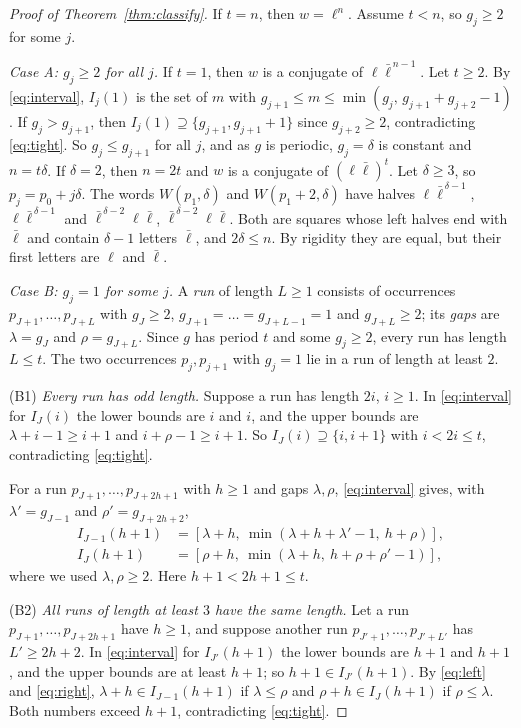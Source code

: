 \documentclass[11pt,reqno]{amsart}
\theoremstyle{definition}
\newcommand{\lb}{\bar\ell}
\begin{document}
\begin{proof}[Proof of Theorem~\ref{thm:classify}]
If $t=n$, then $w=\ell^n$. Assume $t<n$, so $g_j\ge 2$ for some $j$.

\emph{Case A: $g_j\ge 2$ for all $j$.} If $t=1$, then $w$ is a conjugate of $\ell\lb^{\,n-1}$. Let $t\ge 2$. By \eqref{eq:interval}, $I_j(1)$ is the set of $m$ with $g_{j+1}\le m\le\min(g_j,\,g_{j+1}+g_{j+2}-1)$. If $g_j>g_{j+1}$, then $I_j(1)\supseteq\{g_{j+1},g_{j+1}+1\}$ since $g_{j+2}\ge 2$, contradicting \eqref{eq:tight}. So $g_j\le g_{j+1}$ for all $j$, and as $g$ is periodic, $g_j=\delta$ is constant and $n=t\delta$. If $\delta=2$, then $n=2t$ and $w$ is a conjugate of $(\ell\lb)^t$. Let $\delta\ge 3$, so $p_{j}=p_0+j\delta$. The words $W(p_1,\delta)$ and $W(p_1+2,\delta)$ have halves $\ell\lb^{\,\delta-1}$, $\ell\lb^{\,\delta-1}$ and $\lb^{\,\delta-2}\ell\lb$, $\lb^{\,\delta-2}\ell\lb$. Both are squares whose left halves end with $\lb$ and contain $\delta-1$ letters $\lb$, and $2\delta\le n$. By rigidity they are equal, but their first letters are $\ell$ and $\lb$.

\emph{Case B: $g_j=1$ for some $j$.} A \emph{run} of length $L\ge 1$ consists of occurrences $p_{J+1},\dots,p_{J+L}$ with $g_J\ge 2$, $g_{J+1}=\dots=g_{J+L-1}=1$ and $g_{J+L}\ge 2$; its \emph{gaps} are $\lambda=g_J$ and $\rho=g_{J+L}$. Since $g$ has period $t$ and some $g_j\ge 2$, every run has length $L\le t$. The two occurrences $p_j,p_{j+1}$ with $g_j=1$ lie in a run of length at least $2$.

(B1) \emph{Every run has odd length.} Suppose a run has length $2i$, $i\ge 1$. In \eqref{eq:interval} for $I_J(i)$ the lower bounds are $i$ and $i$, and the upper bounds are $\lambda+i-1\ge i+1$ and $i+\rho-1\ge i+1$. So $I_J(i)\supseteq\{i,i+1\}$ with $i<2i\le t$, contradicting \eqref{eq:tight}.

For a run $p_{J+1},\dots,p_{J+2h+1}$ with $h\ge 1$ and gaps $\lambda,\rho$, \eqref{eq:interval} gives, with $\lambda'=g_{J-1}$ and $\rho'=g_{J+2h+2}$,
\begin{align}
I_{J-1}(h+1)&=[\lambda+h,\ \min(\lambda+h+\lambda'-1,\ h+\rho)],\label{eq:left}\\
I_J(h+1)&=[\rho+h,\ \min(\lambda+h,\ h+\rho+\rho'-1)],\label{eq:right}
\end{align}
where we used $\lambda,\rho\ge 2$. Here $h+1<2h+1\le t$.

(B2) \emph{All runs of length at least $3$ have the same length.} Let a run $p_{J+1},\dots,p_{J+2h+1}$ have $h\ge 1$, and suppose another run $p_{J'+1},\dots,p_{J'+L'}$ has $L'\ge 2h+2$. In \eqref{eq:interval} for $I_{J'}(h+1)$ the lower bounds are $h+1$ and $h+1$, and the upper bounds are at least $h+1$; so $h+1\in I_{J'}(h+1)$. By \eqref{eq:left} and \eqref{eq:right}, $\lambda+h\in I_{J-1}(h+1)$ if $\lambda\le\rho$ and $\rho+h\in I_J(h+1)$ if $\rho\le\lambda$. Both numbers exceed $h+1$, contradicting \eqref{eq:tight}.


\end{proof}
\end{document}
